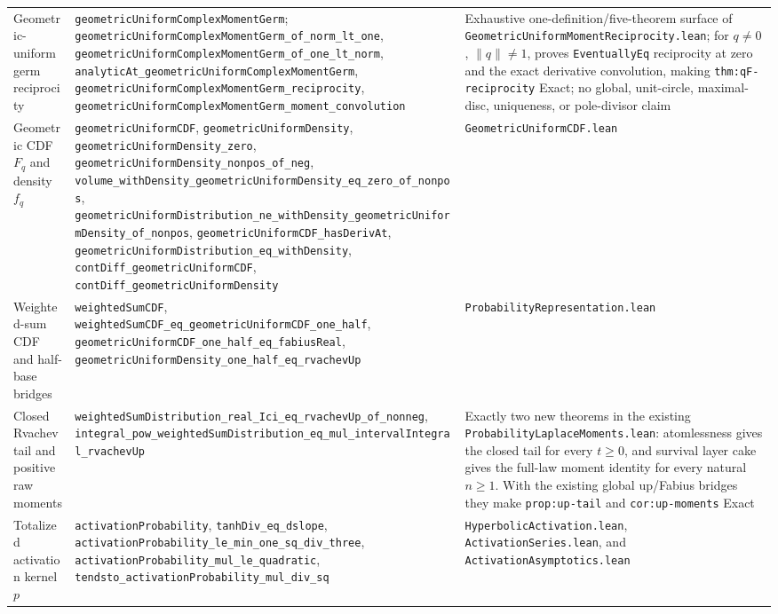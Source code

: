 \documentclass[11pt,oneside]{article}
\theoremstyle{definition}
\theoremstyle{remark}
\begin{document}
\begin{longtable}{@{}>{\raggedright\arraybackslash}p{} >{\raggedright\arraybackslash}p{} >{\raggedright\arraybackslash}p{}@{}}
Geometric-uniform germ reciprocity & \nolinkurl{geometricUniformComplexMomentGerm}; \nolinkurl{geometricUniformComplexMomentGerm_of_norm_lt_one}, \nolinkurl{geometricUniformComplexMomentGerm_of_one_lt_norm}, \nolinkurl{analyticAt_geometricUniformComplexMomentGerm}, \nolinkurl{geometricUniformComplexMomentGerm_reciprocity}, \nolinkurl{geometricUniformComplexMomentGerm_moment_convolution} & Exhaustive one-definition/five-theorem surface of \nolinkurl{GeometricUniformMomentReciprocity.lean}; for \(q\ne0\), \(\lVert q\rVert\ne1\), proves \nolinkurl{EventuallyEq} reciprocity at zero and the exact derivative convolution, making \nolinkurl{thm:qF-reciprocity} Exact; no global, unit-circle, maximal-disc, uniqueness, or pole-divisor claim \\
Geometric CDF \(F_q\) and density \(f_q\) & \nolinkurl{geometricUniformCDF}, \nolinkurl{geometricUniformDensity}, \nolinkurl{geometricUniformDensity_zero}, \nolinkurl{geometricUniformDensity_nonpos_of_neg}, \nolinkurl{volume_withDensity_geometricUniformDensity_eq_zero_of_nonpos}, \nolinkurl{geometricUniformDistribution_ne_withDensity_geometricUniformDensity_of_nonpos}, \nolinkurl{geometricUniformCDF_hasDerivAt}, \nolinkurl{geometricUniformDistribution_eq_withDensity}, \nolinkurl{contDiff_geometricUniformCDF}, \nolinkurl{contDiff_geometricUniformDensity} & \nolinkurl{GeometricUniformCDF.lean} \\
Weighted-sum CDF and half-base bridges & \nolinkurl{weightedSumCDF}, \nolinkurl{weightedSumCDF_eq_geometricUniformCDF_one_half}, \nolinkurl{geometricUniformCDF_one_half_eq_fabiusReal}, \nolinkurl{geometricUniformDensity_one_half_eq_rvachevUp} & \nolinkurl{ProbabilityRepresentation.lean} \\
Closed Rvachev tail and positive raw moments & \nolinkurl{weightedSumDistribution_real_Ici_eq_rvachevUp_of_nonneg}, \nolinkurl{integral_pow_weightedSumDistribution_eq_mul_intervalIntegral_rvachevUp} & Exactly two new theorems in the existing \nolinkurl{ProbabilityLaplaceMoments.lean}: atomlessness gives the closed tail for every \(t\geq0\), and survival layer cake gives the full-law moment identity for every natural \(n\geq1\).  With the existing global up/Fabius bridges they make \nolinkurl{prop:up-tail} and \nolinkurl{cor:up-moments} Exact \\
Totalized activation kernel \(p\) & \nolinkurl{activationProbability}, \nolinkurl{tanhDiv_eq_dslope}, \nolinkurl{activationProbability_le_min_one_sq_div_three}, \nolinkurl{activationProbability_mul_le_quadratic}, \nolinkurl{tendsto_activationProbability_mul_div_sq} & \nolinkurl{HyperbolicActivation.lean}, \nolinkurl{ActivationSeries.lean}, and \nolinkurl{ActivationAsymptotics.lean} \\

\end{longtable}
\end{document}
